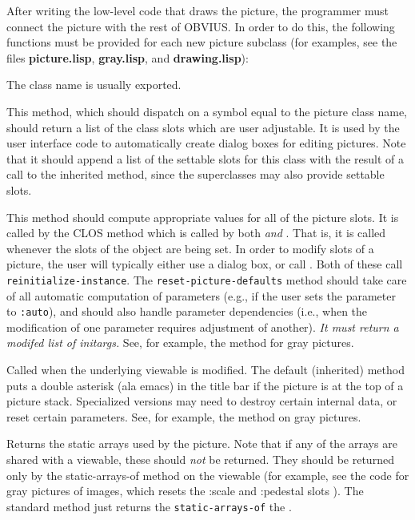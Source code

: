 After writing the low-level code that draws the picture, the
programmer must connect the picture with the rest of OBVIUS.  In order
to do this, the following functions must be provided for each new
picture subclass (for examples, see the files {\bf picture.lisp},
{\bf gray.lisp}, and {\bf drawing.lisp}):
\begin{description}

\item{}
The class name is usually exported.

\item{}
This method, which should dispatch on a symbol equal to the picture
class name, should return a list of the class slots which are user
adjustable.  It is used by the user interface code to automatically
create dialog boxes for editing pictures.  Note that it should append
a list of the settable slots for this class with the result of a call
to the inherited method, since the superclasses may also provide
settable slots.

\item{}
This method should compute appropriate values for all of the picture
slots.  It is called by the CLOS method  which
is called by both  {\em and}
.  That is, it is called whenever the
slots of the object are being set.  In order to modify slots of a
picture, the user will typically either use a dialog box, or call
.  Both of these call {\tt reinitialize-instance}.  The
{\tt reset-picture-defaults} method should take care of all automatic
computation of parameters (e.g., if the user sets the parameter to
{\tt :auto}), and should also handle parameter dependencies (i.e.,
when the modification of one parameter requires adjustment of
another).  {\em It must return a modifed list of initargs.}  See, for
example, the method for gray pictures.

\item{}
Called when the underlying viewable is modified.  The default
(inherited) method puts a double asterisk (ala emacs) in the title bar
if the picture is at the top of a picture stack.  Specialized versions
may need to destroy certain internal data, or reset certain
parameters.  See, for example, the method on gray pictures.

\item{}
Returns the static arrays used by the picture.  Note that if any
of the arrays are shared with a viewable, these should {\em not} be
returned.  They should be returned only by the static-arrays-of method
on the viewable (for example, see the code for gray pictures of
images, which resets the :scale and :pedestal slots ).  The standard
method just returns the {\tt static-arrays-of} the .


\end{description}
